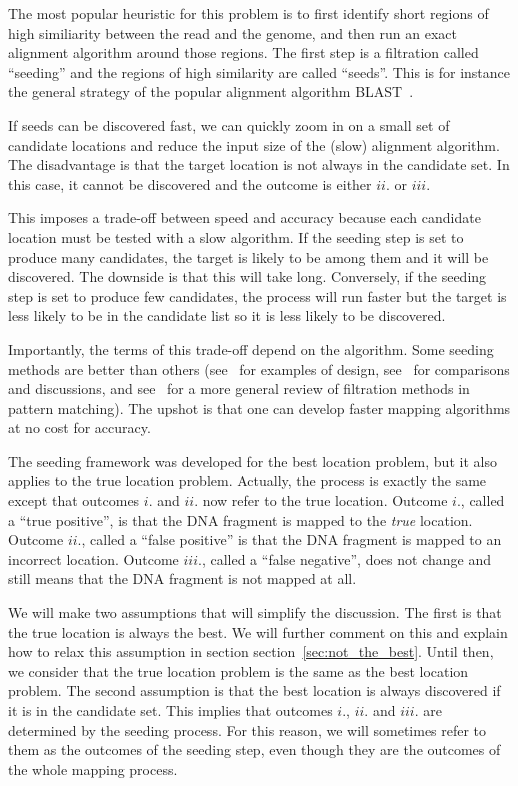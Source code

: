 \documentclass{article}
\begin{document}
The most popular heuristic for this problem is to first identify short
regions of high similiarity between the read and the genome, and then run
an exact alignment algorithm around those regions. The first step is a
filtration called ``seeding'' and the regions of high similarity
are called ``seeds''. This is for instance the general strategy of the
popular alignment algorithm BLAST~\cite{pmid2231712}.

If seeds can be discovered fast, we can quickly zoom in on a small set of
candidate locations and reduce the input size of the (slow) alignment
algorithm. The disadvantage is that the target location is not always in
the candidate set. In this case, it cannot be discovered and the outcome
is either $ii.$ or $iii.$

This imposes a trade-off between speed and accuracy because each candidate
location must be tested with a slow algorithm. If the seeding step is set
to produce many candidates, the target is likely to be among them and it
will be discovered. The downside is that this will take long. Conversely,
if the seeding step is set to produce few candidates, the process will
run faster but the target is less likely to be in the candidate list so it
is less likely to be discovered.

Importantly, the terms of this trade-off depend on the algorithm. Some
seeding methods are better than others (see~\cite{sun2005designing,
pmid11934743,xu2006optimizing,pmid17044164,brejova2003vector,
pmid18684737} for examples of design, see~\cite{pmid16533404,pmid20460430}
for comparisons and discussions, and see~\cite{navarro2001guided} for a
more general review of filtration methods in pattern matching). The upshot
is that one can develop faster mapping algorithms at no cost for accuracy.

The seeding framework was developed for the best location problem, but it
also applies to the true location problem. Actually, the process is
exactly the same except that outcomes $i.$ and $ii.$ now refer to the true
location. Outcome $i.$, called a ``true positive'', is that the DNA
fragment is mapped to the \emph{true} location. Outcome $ii.$, called a
``false positive'' is that the DNA fragment is mapped to an incorrect
location. Outcome $iii.$, called a ``false negative'', does not change and
still means that the DNA fragment is not mapped at all.

We will make two assumptions that will simplify the discussion. The first
is that the true location is always the best. We will further comment on
this and explain how to relax this assumption in section
section~\ref{sec:not_the_best}. Until then, we consider that the true
location problem is the same as the best location problem. The second
assumption is that the best location is always discovered if it is in the
candidate set. This implies that outcomes $i.$, $ii.$ and $iii.$ are
determined by the seeding process. For this reason, we will sometimes
refer to them as the outcomes of the seeding step, even though they are
the outcomes of the whole mapping process.
\end{document}

